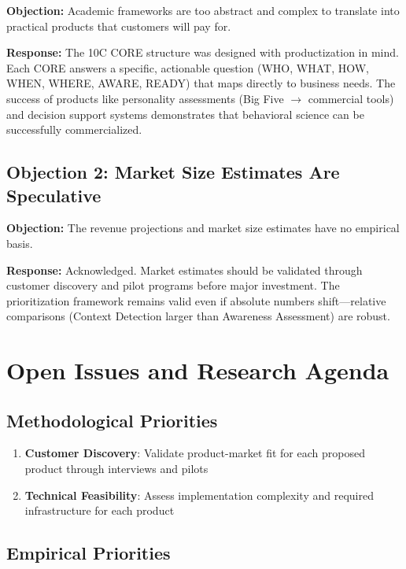 \textbf{Objection:} Academic frameworks are too abstract and complex to translate into practical products that customers will pay for.

\textbf{Response:} The 10C CORE structure was designed with productization in mind. Each CORE answers a specific, actionable question (WHO, WHAT, HOW, WHEN, WHERE, AWARE, READY) that maps directly to business needs. The success of products like personality assessments (Big Five $\to$ commercial tools) and decision support systems demonstrates that behavioral science can be successfully commercialized.

\subsection{Objection 2: Market Size Estimates Are Speculative}

\textbf{Objection:} The revenue projections and market size estimates have no empirical basis.

\textbf{Response:} Acknowledged. Market estimates should be validated through customer discovery and pilot programs before major investment. The prioritization framework remains valid even if absolute numbers shift---relative comparisons (Context Detection larger than Awareness Assessment) are robust.


\section{Open Issues and Research Agenda}
\label{sec:vvv3-open}

\subsection{Methodological Priorities}

\begin{enumerate}
    \item \textbf{Customer Discovery}: Validate product-market fit for each proposed product through interviews and pilots
    \item \textbf{Technical Feasibility}: Assess implementation complexity and required infrastructure for each product
\end{enumerate}

\subsection{Empirical Priorities}

